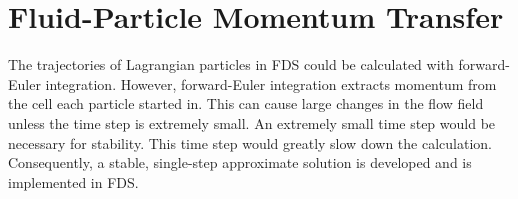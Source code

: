 


\chapter{Fluid-Particle Momentum Transfer}

The trajectories of Lagrangian particles in FDS could be calculated with forward-Euler integration. However, forward-Euler integration extracts momentum from the cell each particle started in. This can cause large changes in the flow field unless the time step is extremely small. An extremely small time step would be necessary for stability. This time step would greatly slow down the calculation. Consequently, a stable, single-step approximate solution is developed and is implemented in FDS.

